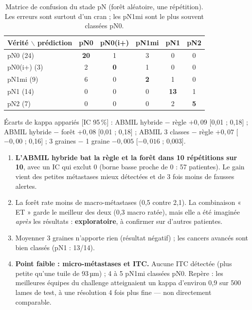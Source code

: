 \documentclass[11pt,a4paper]{article}
\begin{document}
\begin{table}[H]
\centering\small
\begin{tabular}{l|ccccc}
\toprule
\textbf{Vérité $\backslash$ prédiction} & pN0 & pN0(i+) & pN1mi & pN1 & pN2 \\
\midrule
pN0 (24) & \textbf{20} & 1 & 3 & 0 & 0 \\
pN0(i+) (3) & 2 & \textbf{0} & 1 & 0 & 0 \\
pN1mi (9) & 6 & 0 & \textbf{2} & 1 & 0 \\
pN1 (14) & 0 & 0 & 0 & \textbf{13} & 1 \\
pN2 (7) & 0 & 0 & 0 & 2 & \textbf{5} \\
\bottomrule
\end{tabular}
\caption{Matrice de confusion du stade pN (forêt aléatoire, une répétition). Les erreurs sont surtout d'un cran ; les pN1mi sont
le plus souvent classées pN0.}
\label{tab:confpn}
\end{table}

\noindent Écarts de kappa appariés [IC 95\,\%] : ABMIL hybride $-$ règle $+0{,}09$ [0,01 ; 0,18] ; ABMIL hybride $-$ forêt
$+0{,}08$ [0,01 ; 0,18] ; ABMIL 3 classes $-$ règle $+0{,}07$ [$-0{,}00$ ; 0,16] ; 3 graines $-$ 1 graine $-0{,}005$ [$-0{,}016$ ; 0,003].

\begin{constat}
\begin{enumerate}
  \item \textbf{L'ABMIL hybride bat la règle et la forêt dans 10 répétitions sur 10}, avec un IC qui exclut 0 (borne basse proche de 0 :
        57 patientes). Le gain vient des petites métastases mieux détectées et de 3 fois moins de fausses alertes.
  \item La forêt rate moins de macro-métastases (0,5 contre 2,1). La combinaison « ET » garde le meilleur des deux (0,3 macro ratée),
        mais elle a été imaginée \emph{après} les résultats : \textbf{exploratoire}, à confirmer sur d'autres patientes.
  \item Moyenner 3 graines n'apporte rien (résultat négatif) ; les cancers avancés sont bien classés (pN1 : 13/14).
  \item \textbf{Point faible : micro-métastases et ITC.} Aucune ITC détectée (plus petite qu'une tuile de 93\,µm) ; 4 à 5 pN1mi
        classées pN0. Repère : les meilleures équipes du challenge atteignaient un kappa d'environ 0,9 sur 500 lames de test, à une
        résolution 4 fois plus fine — non directement comparable.
\end{enumerate}
\end{constat}
\end{document}
